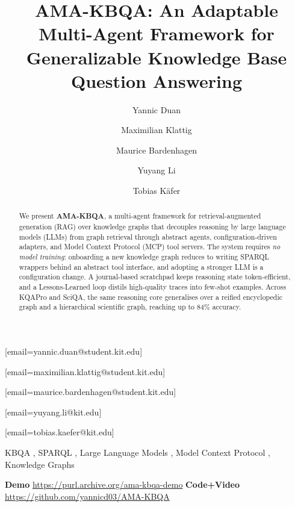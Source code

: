 \documentclass[sigconf,natbib=true]{ceurart}
\begin{document}


\title{AMA-KBQA: An Adaptable Multi-Agent Framework for Generalizable Knowledge Base Question Answering}

\author[1]{Yannic Duan}
[email=yannic.duan@student.kit.edu]
\author[1]{Maximilian Klattig}[email=maximilian.klattig@student.kit.edu]
\author[1]{Maurice Bardenhagen}[email=maurice.bardenhagen@student.kit.edu]
\author[1]{Yuyang Li}[email=yuyang.li@kit.edu]
\author[1]{Tobias Käfer}[email=tobias.kaefer@kit.edu]
\address[1]{Karlsruhe Institute of Technology (KIT), Institute of Applied Informatics and Formal Description Methods (AIFB), Karlsruhe, Germany}

\begin{abstract}
We present \textbf{AMA-KBQA}, a multi-agent framework for
retrieval-augmented generation (RAG) over knowledge graphs that
decouples reasoning by large language models (LLMs) from graph
retrieval through abstract agents, configuration-driven adapters, and
Model Context Protocol (MCP) tool servers. The system requires
\emph{no model training}: onboarding a new knowledge graph reduces to
writing SPARQL wrappers behind an abstract tool interface, and
adopting a stronger LLM is a configuration change. A journal-based
scratchpad keeps reasoning state token-efficient, and a
Lessons-Learned loop distils high-quality traces into few-shot
examples. Across KQAPro and SciQA, the same reasoning core generalises
over a reified encyclopedic graph and a hierarchical scientific graph,
reaching up to 84\% accuracy.
\end{abstract}

\begin{keywords}
  KBQA \sep
  SPARQL \sep
  Large Language Models \sep
  Model Context Protocol \sep
  Knowledge Graphs
\end{keywords}

\maketitle

\vspace{-1em}
{\footnotesize
\noindent\hspace*{\dimexpr.1\textwidth-3pt}%
\textbf{Demo} \url{https://purl.archive.org/ama-kbqa-demo}\enspace
\textbf{Code+Video} \url{https://github.com/yannicd03/AMA-KBQA}\par}
\end{document}
